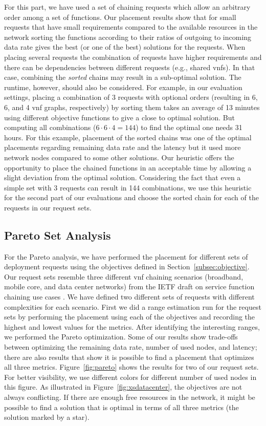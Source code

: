 \documentclass[10pt,a4paper,conference]{IEEEtran}
\begin{document}
For this part, we have used a set of chaining requests which allow an arbitrary order
among a set of functions. Our placement results show that for small requests that
have small requirements compared to the available resources in the network sorting
the functions according to their ratios of outgoing to incoming data rate gives 
the best (or one of the best) solutions for the requests. When placing several requests 
the combination of requests have higher requirements and there can be dependencies 
between different requests (e.g., shared \acp{vnf}). In that case, combining the 
\emph{sorted} chains may result in a sub-optimal solution. 
The runtime, however, should also be considered. For example, 
in our evaluation settings, placing a combination of 3 requests with optional orders 
(resulting in 6, 6, and 4 \ac{vnf} graphs, respectively) 
by sorting them takes an average of 13 minutes using different objective 
functions to give a close to optimal solution. But 
computing all combinations ($ 6 {\cdot} 6 {\cdot} 4 {=} 144 $) to find the optimal one needs 31 hours. For 
this example, placement of the sorted chains was one of the optimal placements regarding 
remaining data rate and the latency but it used more network nodes compared to some
other solutions. Our heuristic offers the opportunity to place the chained functions in an
acceptable time by allowing a slight deviation from the optimal solution. Considering
the fact that even a simple set with 3 requests can result in 144 combinations, 
we use this heuristic for the second part of our evaluations and choose the
sorted chain for each of the requests in our request sets.


\subsection{Pareto Set Analysis}

For the Pareto analysis, we have performed 
the placement for different sets of deployment requests using the objectives defined in
Section~\ref{subsec:objective}. Our request sets resemble three different \ac{vnf} chaining
scenarios (broadband, mobile core, and data center networks) from the
IETF draft on service function chaining use cases \cite{draft-liu-sfc-use-cases-05}. We 
have defined two different sets of requests with different complexities for each 
scenario. First we did a range estimation run for the request sets by performing the 
placement using each of the objectives and recording the highest and lowest values 
for the metrics. After identifying the interesting ranges, we performed
the Pareto optimization. Some of our results show trade-offs between optimizing
the remaining data rate, number of used nodes, and latency; there are also
results that show it is possible to find a placement that optimizes all three
metrics. Figure~\ref{fig:pareto} shows the results for two of our request sets.
For better visibility, we use different colors for different number of used nodes 
in this figure. As illustrated in Figure~\ref{fig:xsdatacenter}, the objectives are not 
always conflicting. If there are enough free resources in the network, it might be possible 
to find a solution that is optimal in terms of all three metrics (the solution marked by a star).
\end{document}
